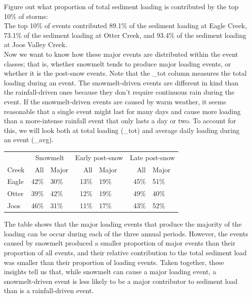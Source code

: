 \documentclass[12pt]{article}
\begin{document}
Figure out what proportion of total sediment loading is contributed by the top 10\% of storms:\\








The top 10\% of events contributed 89.1\% of the sediment loading at Eagle Creek, 73.1\% of the sediment loading at Otter Creek, and 93.4\% of the sediment loading at Joos Valley Creek.\\

Now we want to know how these major events are distributed within the event classes; that is, whether snowmelt tends to produce major loading events, or whether it is the post-snow events. Note that the \_tot column measures the total loading during an event. The snowmelt-driven events are different in kind than the rainfall-driven ones because they don't require continuous rain during the event. If the snowmelt-driven events are caused by warm weather, it seems reasonable that a single event might last for many days and cause more loading than a more-intense rainfall event that only lasts a day or two. To account for this, we will look both at total loading (\_tot) and average daily loading during an event (\_avg).\\


\begin{table}[h]
    \begin{center}
    \begin{tabular}{lr|lr|lr|l}
        & \multicolumn{2}{c}{Snowmelt    }\ & \multicolumn{2}{c}{Early post-snow}\ & \multicolumn{2}{c}{Late post-snow} \\
        Creek & All & Major & All & Major & All & Major \\
        \hline 
        Eagle & 42\% & 30\% & 13\% & 19\% & 45\% & 51\% \\
        Otter & 39\% & 42\% & 12\% & 19\% & 49\% & 40\% \\
        Joos & 46\% & 31\% & 11\% & 17\% & 43\% & 52\% \\
        
    \end{tabular}
    \end{center}
\end{table}



The table shows that the major loading events that produce the majority of the loading can be occur during each of the three annual periods. However, the events caused by snowmelt produced a smaller proportion of major events than their proportion of all events, and their relative contribution to the total sediment load was smaller than their proportion of loading events. Taken together, these insights tell us that, while snowmelt can cause a major loading event, a snowmelt-driven event is less likely to be a major contributor to sediment load than is a rainfall-driven event.\\
\end{document}
